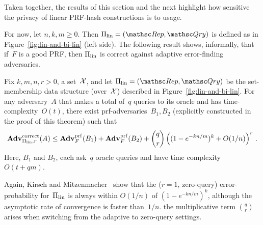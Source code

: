 Taken together, the results of this section and the next highlight how sensitive the privacy of linear PRF-hash constructions is to usage.


For now, let $n,k,m \geq 0$.  Then $\setprim_{\mathrm{lin}}= (\Rep, \Qry)$ is defined as in Figure~\ref{fig:lin-and-bi-lin} (left side).  The following result shows, informally, that if~$F$ is a good PRF, then $\Pi_{\mathrm{lin}}$ is correct against adaptive error-finding adversaries.

\begin{theorem}\label{thm1}\label{thm:lin-correctness}
Fix $k,m,n,r>0$, a set~${\cal X}$, and let $\setprim_{\mathrm{lin}}= (\Rep, \Qry)$ be the set-membership data structure (over~${\cal X}$) described in Figure~\ref{fig:lin-and-bi-lin}.  For any adversary~$A$ that makes a total of~$q$ queries to its oracle and has time-complexity~$O(t)$, there exist prf-adversaries~$B_1,B_2$ (explicitly constructed in the proof of this theorem) such that
\[
\mathrm{\mathbf{Adv}}^{\mathrm{correct}}_{\Pi_{\mathrm{lin}},r}(A) \leq  \mathbf{Adv}^{\mathrm{prf}}_{F}(B_1) + \mathbf{Adv}^{\mathrm{prf}}_{F}(B_2)  +{\dbinom{q}{r}} \left( (1-e^{-kn/m})^k + O(1/n) \right)^r\,.
\]
Here, $B_1$ and $B_2$, each ask~$q$ oracle queries and have time complexity~$O(t+qm)$.
\end{theorem}
Again, Kirsch and Mitzenmacher~\cite{kirsch2006less} show
that the ($r=1$, zero-query) error-probability for~$\Pi_\mathrm{lin}$ is
always within $O(1/n)$ of $(1-e^{-kn/m})^k$, although the asymptotic
rate of convergence is faster than~$1/n$.
the multiplicative term $\binom{q}{r}$ arises when switching from the adaptive to zero-query settings.



